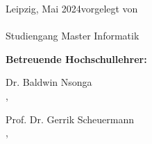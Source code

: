 \begin{titlepage}
\begin{center}
		\renewcommand{\arraystretch}{1}
  \end{center}
  
Leipzig, Mai 2024\hfill vorgelegt von \\[3mm]
\hspace*{\fill} {\large \myfirstname~\mylastname}\\
\hspace*{\fill} Studiengang Master Informatik

\vspace{1cm}

{\large\textbf{Betreuende Hochschullehrer:}}

{\large Dr. Baldwin Nsonga}\\
\quad \hspace{1cm} \myuni, \myworkinggroup

{\large Prof. Dr. Gerrik Scheuermann}\\
\quad \myuni, \myworkinggroup
  \makeatother
\end{titlepage}

\newpage
\null
\thispagestyle{empty}
\newpage
